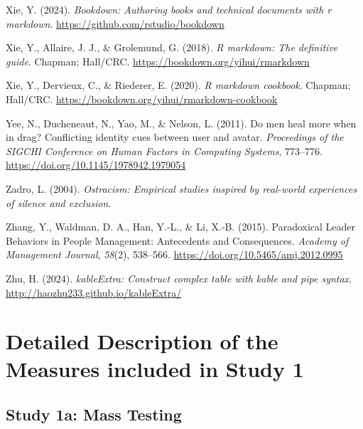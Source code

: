 \documentclass[
]{udthesis}
\newlength{\cslhangindent}
\newenvironment{CSLReferences}[2] %
 {\begin{list}{}{%
  \setlength{\itemindent}{0pt}
  \setlength{\leftmargin}{0pt}
  \setlength{\parsep}{0pt}
  \ifodd #1
   \setlength{\leftmargin}{\cslhangindent}
   \setlength{\itemindent}{-1\cslhangindent}
  \fi
  \setlength{\itemsep}{#2\baselineskip}}}
 {\end{list}}
\begin{document}
\begin{CSLReferences}{1}{0}
Xie, Y. (2024). \emph{Bookdown: Authoring books and technical documents with r markdown}. \url{https://github.com/rstudio/bookdown}

Xie, Y., Allaire, J. J., \& Grolemund, G. (2018). \emph{R markdown: The definitive guide}. Chapman; Hall/CRC. \url{https://bookdown.org/yihui/rmarkdown}

Xie, Y., Dervieux, C., \& Riederer, E. (2020). \emph{R markdown cookbook}. Chapman; Hall/CRC. \url{https://bookdown.org/yihui/rmarkdown-cookbook}

Yee, N., Ducheneaut, N., Yao, M., \& Nelson, L. (2011). Do men heal more when in drag? Conflicting identity cues between user and avatar. \emph{Proceedings of the {SIGCHI Conference} on {Human Factors} in {Computing Systems}}, 773--776. \url{https://doi.org/10.1145/1978942.1979054}

Zadro, L. (2004). \emph{Ostracism: {Empirical} studies inspired by real-world experiences of silence and exclusion}.

Zhang, Y., Waldman, D. A., Han, Y.-L., \& Li, X.-B. (2015). Paradoxical {Leader Behaviors} in {People Management}: {Antecedents} and {Consequences}. \emph{Academy of Management Journal}, \emph{58}(2), 538--566. \url{https://doi.org/10.5465/amj.2012.0995}

Zhu, H. (2024). \emph{kableExtra: Construct complex table with kable and pipe syntax}. \url{http://haozhu233.github.io/kableExtra/}

\end{CSLReferences}

\appendix {}


\chapter{Detailed Description of the Measures included in Study 1}\label{detailed-description-of-the-measures-included-in-study-1}

\section{Study 1a: Mass Testing}\label{study-1a-mass-testing}
\end{document}

